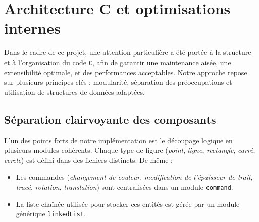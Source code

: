 \documentclass[12pt,a4paper]{article}
\begin{document}
\newpage
\section{Architecture C et optimisations internes}

Dans le cadre de ce projet, une attention particulière a été portée à la structure et à l’organisation du code \texttt{C}, afin de garantir une maintenance aisée, une extensibilité optimale, et des performances acceptables. Notre approche repose sur plusieurs principes clés : modularité, séparation des préoccupations et utilisation de structures de données adaptées.


\subsection{Séparation clairvoyante des composants}
L’un des points forts de notre implémentation est le découpage logique en plusieurs modules cohérents. Chaque type de figure (\textit{point}, \textit{ligne}, \textit{rectangle}, \textit{carré}, \textit{cercle}) est défini dans des fichiers distincts. De même :
\begin{itemize}
    \item Les commandes (\textit{changement de couleur}, \textit{modification de l’épaisseur de trait}, \textit{tracé}, \textit{rotation}, \textit{translation}) sont centralisées dans un module \texttt{command}.
    \item La liste chaînée utilisée pour stocker ces entités est gérée par un module générique \texttt{linkedList}.
\end{itemize} 
\end{document}
